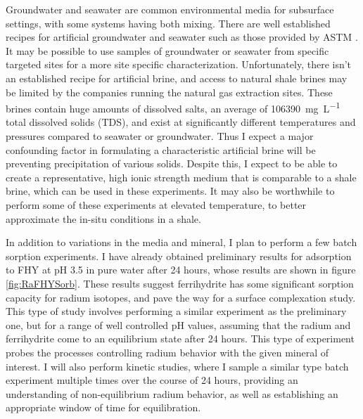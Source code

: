 \documentclass[twoside,12pt,titlepage]{article}
\newcommand{\isotope}[2]{\ch{^{#1}#2}}
\begin{document}
Groundwater and seawater are common environmental media for subsurface settings, with some systems having both mixing. There are well established recipes for artificial groundwater and seawater such as those provided by ASTM \cite{ASTMSeawater2013}. It may be possible to use samples of groundwater or seawater from specific targeted sites for a more site specific characterization. Unfortunately, there isn't an established recipe for artificial brine, and access to natural shale brines may be limited by the companies running the natural gas extraction sites. These brines contain huge amounts of dissolved salts, an average of \SI{106390}{\milli\gram\per\liter} total dissolved solids (TDS), and exist at significantly different temperatures and pressures compared to seawater or groundwater. Thus I expect a major confounding factor in formulating a characteristic artificial brine will be preventing precipitation of various solids. Despite this, I expect to be able to create a representative, high ionic strength medium that is comparable to a shale brine, which can be used in these experiments. It may also be worthwhile to perform some of these experiments at elevated temperature, to better approximate the in-situ conditions in a shale.

\par In addition to variations in the media and mineral, I plan to perform a few batch sorption experiments. I have already obtained preliminary results for \isotope{226}{Ra} adsorption to FHY at pH 3.5 in pure water after 24 hours, whose results are shown in figure \ref{fig:RaFHYSorb}. These results suggest ferrihydrite has some significant sorption capacity for radium isotopes, and pave the way for a surface complexation study. This type of study involves performing a similar experiment as the preliminary one, but for a range of well controlled pH values, assuming that the radium and ferrihydrite come to an equilibrium state after 24 hours. This type of experiment probes the processes controlling radium behavior with the given mineral of interest. I will also perform kinetic studies, where I sample a similar type batch experiment multiple times over the course of 24 hours, providing an understanding of non-equilibrium radium behavior, as well as establishing an appropriate window of time for equilibration.
\end{document}
